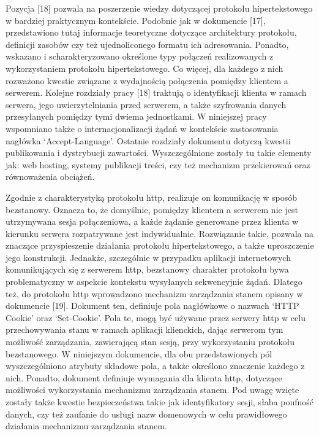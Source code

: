 Pozycja [18] pozwala na poszerzenie wiedzy dotyczącej protokołu hipertekstowego w bardziej praktycznym kontekście. Podobnie jak w dokumencie [17], przedstawiono tutaj informacje teoretyczne dotyczące architektury protokołu, definicji zasobów czy też ujednoliconego formatu ich adresowania. Ponadto, wskazano i scharakteryzowano określone typy połączeń realizowanych z wykorzystaniem protokołu hipertekstowego. Co więcej, dla każdego z nich rozważono kwestie związane z wydajnością połączenia pomiędzy klientem a serwerem. Kolejne rozdziały pracy [18] traktują o identyfikacji klienta w ramach serwera, jego uwierzytelniania przed serwerem, a także szyfrowania danych przesyłanych pomiędzy tymi dwiema jednostkami.  W niniejszej pracy wspomniano także o internacjonalizacji żądań w kontekście zastosowania nagłówka ‘Accept-Language’. Ostatnie rozdziały dokumentu dotyczą kwestii publikowania i dystrybucji zawartości. Wyszczególnione zostały tu takie elementy jak: web hosting, systemy publikacji treści, czy też mechanizm przekierowań oraz równoważenia obciążeń.

Zgodnie z charakterystyką protokołu http, realizuje on komunikację w sposób bezstanowy. Oznacza to, że domyślnie, pomiędzy klientem a serwerem nie jest utrzymywana sesja połączeniowa, a każde żądanie generowane przez klienta w kierunku serwera rozpatrywane jest indywidualnie. Rozwiązanie takie, pozwala na znaczące przyspieszenie działania protokołu hipertekstowego, a także uproszczenie jego konstrukcji. Jednakże, szczególnie w przypadku aplikacji internetowych komunikujących się z serwerem http, bezstanowy charakter protokołu bywa problematyczny w aspekcie kontekstu wysyłanych sekwencyjnie żądań. Dlatego też, do protokołu http wprowadzono mechanizm zarządzania stanem opisany w dokumencie [19]. Dokument ten, definiuje pola nagłówkowe o nazwach ‘HTTP Cookie’ oraz ‘Set-Cookie’. Pola te, mogą być używane przez serwery http w celu przechowywania stanu w ramach aplikacji klienckich, dając serwerom tym możliwość zarządzania, zawierającą stan sesją, przy wykorzystaniu protokołu bezstanowego. W niniejszym dokumencie, dla obu przedstawionych pól wyszczególniono atrybuty składowe pola, a także określono znaczenie każdego z nich. Ponadto, dokument definiuje wymagania dla klienta http, dotyczące możliwości wykorzystania mechanizmu zarządzania stanem. Pod uwagę wzięte zostały także kwestie bezpieczeństwa takie jak identyfikatory sesji, słaba poufność danych, czy też zaufanie do usługi nazw domenowych w celu prawidłowego działania mechanizmu zarządzania stanem.

